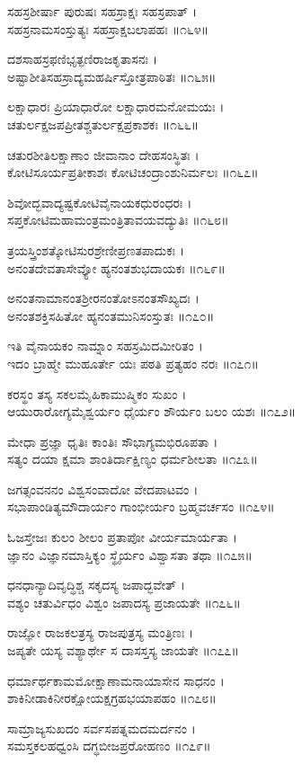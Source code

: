 ಸಹಸ್ರಶೀರ್ಷಾ ಪುರುಷಃ ಸಹಸ್ರಾಕ್ಷಃ ಸಹಸ್ರಪಾತ್ ।\\
ಸಹಸ್ರನಾಮಸಂಸ್ತುತ್ಯಃ ಸಹಸ್ರಾಕ್ಷಬಲಾಪಹಃ ॥೧೬೪॥

ದಶಸಾಹಸ್ರಫಣಿಭೃತ್ಫಣಿರಾಜಕೃತಾಸನಃ ।\\
ಅಷ್ಟಾಶೀತಿಸಹಸ್ರಾದ್ಯಮಹರ್ಷಿಸ್ತೋತ್ರಪಾಠಿತಃ ॥೧೬೫॥

ಲಕ್ಷಾಧಾರಃ ಪ್ರಿಯಾಧಾರೋ ಲಕ್ಷಾಧಾರಮನೋಮಯಃ ।\\
ಚತುರ್ಲಕ್ಷಜಪಪ್ರೀತಶ್ಚತುರ್ಲಕ್ಷಪ್ರಕಾಶಕಃ ॥೧೬೬॥

ಚತುರಶೀತಿಲಕ್ಷಾಣಾಂ ಜೀವಾನಾಂ ದೇಹಸಂಸ್ಥಿತಃ ।\\
ಕೋಟಿಸೂರ್ಯಪ್ರತೀಕಾಶಃ ಕೋಟಿಚಂದ್ರಾಂಶುನಿರ್ಮಲಃ ॥೧೬೭॥

ಶಿವೋದ್ಭವಾದ್ಯಷ್ಟಕೋಟಿವೈನಾಯಕಧುರಂಧರಃ ।\\
ಸಪ್ತಕೋಟಿಮಹಾಮಂತ್ರಮಂತ್ರಿತಾವಯವದ್ಯುತಿಃ ॥೧೬೮॥

ತ್ರಯಸ್ತ್ರಿಂಶತ್ಕೋಟಿಸುರಶ್ರೇಣೀಪ್ರಣತಪಾದುಕಃ ।\\
ಅನಂತದೇವತಾಸೇವ್ಯೋ ಹ್ಯನಂತಶುಭದಾಯಕಃ ॥೧೬೯॥

ಅನಂತನಾಮಾನಂತಶ್ರೀರನಂತೋಽನಂತಸೌಖ್ಯದಃ ।\\
ಅನಂತಶಕ್ತಿಸಹಿತೋ ಹ್ಯನಂತಮುನಿಸಂಸ್ತುತಃ ॥೧೭೦॥


ಇತಿ ವೈನಾಯಕಂ ನಾಮ್ನಾಂ ಸಹಸ್ರಮಿದಮೀರಿತಂ ।\\
ಇದಂ ಬ್ರಾಹ್ಮೇ ಮುಹೂರ್ತೇ ಯಃ ಪಠತಿ ಪ್ರತ್ಯಹಂ ನರಃ ॥೧೭೧॥

ಕರಸ್ಥಂ ತಸ್ಯ ಸಕಲಮೈಹಿಕಾಮುಷ್ಮಿಕಂ ಸುಖಂ ।\\
ಆಯುರಾರೋಗ್ಯಮೈಶ್ವರ್ಯಂ ಧೈರ್ಯಂ ಶೌರ್ಯಂ ಬಲಂ ಯಶಃ ॥೧೭೨॥

ಮೇಧಾ ಪ್ರಜ್ಞಾ ಧೃತಿಃ ಕಾಂತಿಃ ಸೌಭಾಗ್ಯಮಭಿರೂಪತಾ ।\\
ಸತ್ಯಂ ದಯಾ ಕ್ಷಮಾ ಶಾಂತಿರ್ದಾಕ್ಷಿಣ್ಯಂ ಧರ್ಮಶೀಲತಾ ॥೧೭೩॥

ಜಗತ್ಸಂವನನಂ ವಿಶ್ವಸಂವಾದೋ ವೇದಪಾಟವಂ ।\\
ಸಭಾಪಾಂಡಿತ್ಯಮೌದಾರ್ಯಂ ಗಾಂಭೀರ್ಯಂ ಬ್ರಹ್ಮವರ್ಚಸಂ ॥೧೭೪॥

ಓಜಸ್ತೇಜಃ ಕುಲಂ ಶೀಲಂ ಪ್ರತಾಪೋ ವೀರ್ಯಮಾರ್ಯತಾ ।\\
ಜ್ಞಾನಂ ವಿಜ್ಞಾನಮಾಸ್ತಿಕ್ಯಂ ಸ್ಥೈರ್ಯಂ ವಿಶ್ವಾಸತಾ ತಥಾ ॥೧೭೫॥

ಧನಧಾನ್ಯಾದಿವೃದ್ಧಿಶ್ಚ ಸಕೃದಸ್ಯ ಜಪಾದ್ಭವೇತ್ ।\\
ವಶ್ಯಂ ಚತುರ್ವಿಧಂ ವಿಶ್ವಂ ಜಪಾದಸ್ಯ ಪ್ರಜಾಯತೇ ॥೧೭೬॥

ರಾಜ್ಞೋ ರಾಜಕಲತ್ರಸ್ಯ ರಾಜಪುತ್ರಸ್ಯ ಮಂತ್ರಿಣಃ ।\\
ಜಪ್ಯತೇ ಯಸ್ಯ ವಶ್ಯಾರ್ಥೇ ಸ ದಾಸಸ್ತಸ್ಯ ಜಾಯತೇ ॥೧೭೭॥

ಧರ್ಮಾರ್ಥಕಾಮಮೋಕ್ಷಾಣಾಮನಾಯಾಸೇನ ಸಾಧನಂ ।\\
ಶಾಕಿನೀಡಾಕಿನೀರಕ್ಷೋಯಕ್ಷಗ್ರಹಭಯಾಪಹಂ ॥೧೭೮॥

ಸಾಮ್ರಾಜ್ಯಸುಖದಂ ಸರ್ವಸಪತ್ನಮದಮರ್ದನಂ ।\\
ಸಮಸ್ತಕಲಹಧ್ವಂಸಿ ದಗ್ಧಬೀಜಪ್ರರೋಹಣಂ ॥೧೭೯॥

